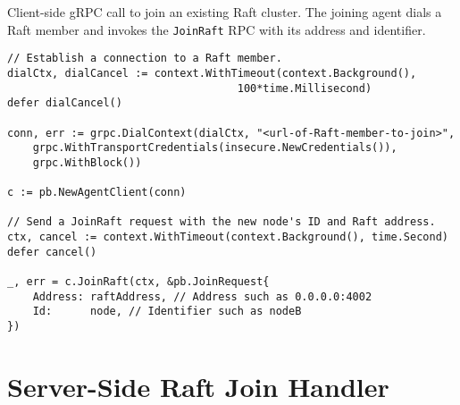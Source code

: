 \begin{listing}[H]
\caption{Client-side gRPC call to join an existing Raft cluster. The joining agent dials a Raft member and invokes the \texttt{JoinRaft} RPC with its address and identifier.}
\begin{verbatim}
// Establish a connection to a Raft member.
dialCtx, dialCancel := context.WithTimeout(context.Background(),
                                    100*time.Millisecond)
defer dialCancel()

conn, err := grpc.DialContext(dialCtx, "<url-of-Raft-member-to-join>",
    grpc.WithTransportCredentials(insecure.NewCredentials()),
    grpc.WithBlock())

c := pb.NewAgentClient(conn)

// Send a JoinRaft request with the new node's ID and Raft address.
ctx, cancel := context.WithTimeout(context.Background(), time.Second)
defer cancel()

_, err = c.JoinRaft(ctx, &pb.JoinRequest{
    Address: raftAddress, // Address such as 0.0.0.0:4002
    Id:      node, // Identifier such as nodeB
})
\end{verbatim}
\end{listing}

\section{Server-Side Raft Join Handler} \label{code:grpc-response-join-request}

